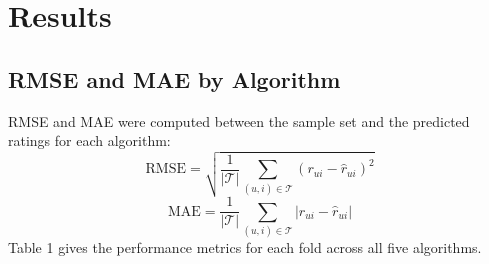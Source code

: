 \section{Results}

\subsection{RMSE and MAE by Algorithm}

RMSE and MAE were computed between the sample set and the predicted ratings for each algorithm:
$$\text{RMSE} = \sqrt{\frac{1}{|\mathcal{T}|}\sum_{(u,i) \in \mathcal{T}}(r_{ui} - \hat{r}_{ui})^2}$$
$$\text{MAE} = \frac{1}{|\mathcal{T}|}\sum_{(u,i) \in \mathcal{T}}|r_{ui} - \hat{r}_{ui}|$$
Table 1 gives the performance metrics for each fold across all five algorithms.

